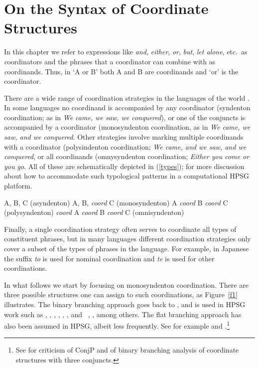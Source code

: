 \documentclass[output=paper
                ,modfonts
                ,nonflat
	        ,collection
	        ,collectionchapter
	        ,collectiontoclongg
 	        ,biblatex
                ,babelshorthands
                ,newtxmath
                ,draftmode
                ,colorlinks, citecolor=brown
]{./langsci/langscibook}
\begin{document}
\section{On the Syntax of Coordinate Structures}

In this chapter we refer to expressions like \emph{and}, \emph{either},  \emph{or}, \emph{but}, 
\emph{let alone}, etc.\ as {\emph coordinators}  and the phrases that a coordinator can combine with as  {\emph coordinands}. 
Thus,  in `A or B' both A and B are coordinands and `or' is the coordinator. 

There are a wide range of coordination strategies in the languages of the world \citet{haspelmath}. In some languages no coordinand is accompanied by any coordinator (syndenton coordination; as in \emph{We came, we saw, we conquered}), or one of the conjuncts is accompanied by a coordinator (monosyndenton coordination,  as in \emph{We came, we saw, and we conquered}. Other strategies involve marking multiple coordinands with a coordinator (polysindenton coordination;
\emph{We came, and we saw, and we conquered}, or all coordinands (omnysyndenton coordination;
\emph{Either you come or you go}.
All of these are schematically depicted in (\ref{types});
 \citet{Drellishak:Bender:05} for more discussion about how to accommodate such typological patterns in a computational HPSG platform.

\begin{exe}
\ex
\begin{xlista}
\ex A, B, C \hfill (asyndenton)
\ex A, B, \emph{coord} C \hfill (monosyndenton)
\ex A \emph{coord} B \emph{coord} C \hfill (polysyndenton)
\ex \emph{coord} A \emph{coord} B \emph{coord} C \hfill (omnisyndenton)
\end{xlista}\label{types}
\end{exe}



\noindent
 Finally, a single coordination strategy often serves to coordinate all types of constituent phrases, but in many languages different coordination strategies only cover a subset of the types of phrases in the language. For example, in
Japanese the suffix \emph{to} is used for nominal coordination
and \emph{te} is used for other coordinations.

In what follows we start by focusing on monosyndenton coordination. There are three possible structures one can assign to such coordinations, as Figure~\ref{f1} illustrates. The binary branching approach goes back to \citet{yngve}, and is used in HPSG work such as
\citet{pollardsag}, \citet{Yatabe:03}, \citet{berthold03},
\citet{Beavers}, \citet{Drellishak:Bender:05}, \citet{Abeille:05}, and
\ \citet{chavesthesis}, \citet{chavesextr}, among others. The flat branching approach has also been  assumed in HPSG, albeit less frequently. See for example
 \citet{sagwasowbender} and  \citet{Sag:03}.\footnote{See \citet{Borsley:05} for criticism of 
ConjP and of binary branching analysis of coordinate structures with three conjuncts.}
\end{document}
